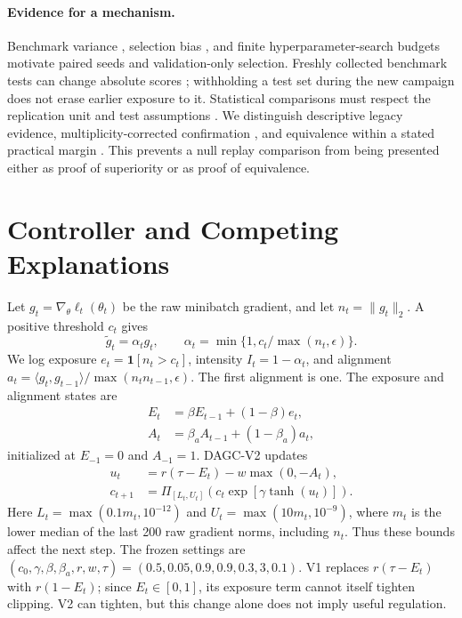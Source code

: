 \documentclass{article}
\begin{document}
\paragraph{Evidence for a mechanism.}
Benchmark variance \citep{bouthillier2021accounting}, selection bias
\citep{cawley2010selection}, and finite hyperparameter-search budgets
\citep{bergstra2012random} motivate paired seeds and validation-only selection.
Freshly collected benchmark tests can change absolute scores
\citep{recht2019generalize}; withholding a test set during the new campaign
does not erase earlier exposure to it. Statistical comparisons must respect
the replication unit and test assumptions \citep{dror2018significance}.
We distinguish descriptive legacy evidence, multiplicity-corrected
confirmation \citep{holm1979simple}, and equivalence within a stated
practical margin \citep{lakens2017equivalence}. This prevents a null replay
comparison from being presented either as proof of superiority or as
proof of equivalence.

\section{Controller and Competing Explanations}
Let $g_t=\nabla_\theta\ell_t(\theta_t)$ be the raw minibatch gradient, and let
$n_t=\|g_t\|_2$. A positive threshold $c_t$ gives
\begin{equation}
 \widetilde g_t=\alpha_tg_t,\qquad
 \alpha_t=\min\{1,c_t/\max(n_t,\epsilon)\}.
 \label{eq:clip}
\end{equation}
We log exposure $e_t=\mathbf{1}[n_t>c_t]$, intensity $I_t=1-\alpha_t$, and
alignment
$a_t=\langle g_t,g_{t-1}\rangle/\max(n_t n_{t-1},\epsilon)$.
The first alignment is one. The exposure and alignment states are
\begin{align}
 E_t&=\beta E_{t-1}+(1-\beta)e_t,\\
 A_t&=\beta_a A_{t-1}+(1-\beta_a)a_t,
\end{align}
initialized at $E_{-1}=0$ and $A_{-1}=1$. DAGC-V2 updates
\begin{align}
 u_t &= r(\tau-E_t)-w\max(0,-A_t), \label{eq:signal}\\
 c_{t+1}&=\Pi_{[L_t,U_t]}\!\left(c_t\exp[\gamma\tanh(u_t)]\right).
 \label{eq:update}
\end{align}
Here $L_t=\max(0.1m_t,10^{-12})$ and
$U_t=\max(10m_t,10^{-9})$, where $m_t$ is the lower median of the last
200 raw gradient norms, including $n_t$. Thus these bounds affect the next
step. The frozen settings are
$(c_0,\gamma,\beta,\beta_a,r,w,\tau)=(0.5,0.05,0.9,0.9,0.3,3,0.1)$.
V1 replaces $r(\tau-E_t)$ with $r(1-E_t)$; since $E_t\in[0,1]$, its exposure
term cannot itself tighten clipping. V2 can tighten, but this change alone
does not imply useful regulation.
\end{document}
